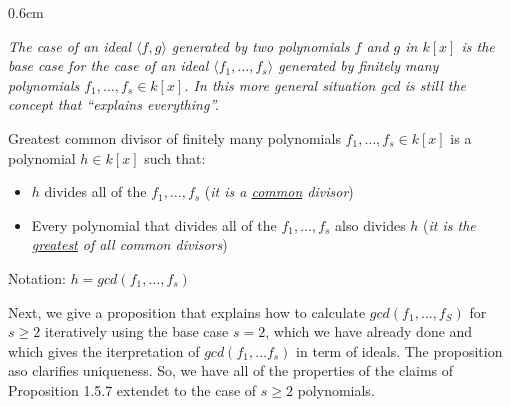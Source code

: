 \begin{addmargin}[0.6cm]{0.6cm}  
\begin{center}
        \textit{\textcolor{airforceblue}{The case of an ideal $\langle f,g \rangle$ generated by two polynomials $f$ and $g$ in $k[x]$ is the base case for the case of an ideal 
        $\langle f_1, \ldots, f_s \rangle$ generated by finitely many polynomials $f_1, \ldots, f_s \in k[x]$. In this more general situation gcd is still the concept that \enquote{explains everything}.}}
    \end{center} 
\end{addmargin} 

\begin{definition}[title = Definition 1.5.8]
  Greatest common divisor of finitely many polynomials $f_1, \ldots, f_s \in k[x]$ is a polynomial $h \in k[x]$ such that: 
  \begin{itemize}
    \item[(i)] $h$ divides all of the $f_1, \ldots, f_s$ (\textit{\textcolor{airforceblue}{it is a \underline{common} divisor}}) 
    \item[(ii)] Every polynomial that divides all of the $f_1, \ldots, f_s$ also divides $h$ (\textit{\textcolor{airforceblue}{it is the \underline{greatest} of all common divisors}})  
  \end{itemize}
  Notation: $h = gcd(f_1, \ldots, f_s)$
\end{definition}

Next, we give a proposition that explains how to calculate  $gcd(f_1, \ldots, f_S)$ for $s \geq 2$ iteratively using the base case $s = 2$, which we have already done 
and which gives the iterpretation of $gcd(f_1, \ldots f_s)$ in term of ideals. The proposition aso clarifies uniqueness. So, we have all of the properties of the claims of 
Proposition 1.5.7 extendet to the case of $s \geq 2$ polynomials. 

